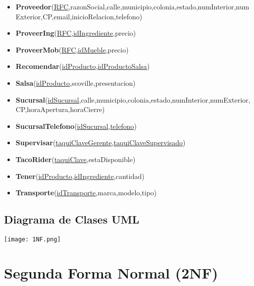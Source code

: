 \documentclass[11pt,letterpaper]{article}
\begin{document}
\begin{itemize}
\item \scriptsize{\textbf{Proveedor}(\underline{RFC},razonSocial,calle,municipio,colonia,estado,numInterior,numExterior,CP,email,inicioRelacion,telefono)}
\item \footnotesize{\textbf{ProveerIng}(\underline{RFC},\underline{idIngrediente},precio)}
\item \footnotesize{\textbf{ProveerMob}(\underline{RFC},\underline{idMueble},precio)}
\item \footnotesize{\textbf{Recomendar}(\underline{idProducto},\underline{idProductoSalsa})}
\item \footnotesize{\textbf{Salsa}(\underline{idProducto},scoville,presentacion)}
\item {\footnotesize \textbf{Sucursal}(\underline{idSucursal},calle,municipio,colonia,estado,numInterior,numExterior,CP,horaApertura,horaCierre)}
\item \footnotesize{\textbf{SucursalTelefono}(\underline{idSucursal},\underline{telefono})}
\item \footnotesize{\textbf{Supervisar}(\underline{taquiClaveGerente},\underline{taquiClaveSupervisado})}
\item \footnotesize{\textbf{TacoRider}(\underline{taquiClave},estaDisponible)}
\item \footnotesize{\textbf{Tener}(\underline{idProducto},\underline{idIngrediente},cantidad)}
\item \footnotesize{\textbf{Transporte}(\underline{idTransporte},marca,modelo,tipo)}



\end{itemize}
\subsection{Diagrama de Clases UML}

\begin{landscape}
\begin{center}
\begin{minipage}{1\linewidth}
\texttt{[image: 1NF.png]}
\end{minipage}
\end{center}
\end{landscape}

\section{Segunda Forma Normal (2NF)}
\end{document}
